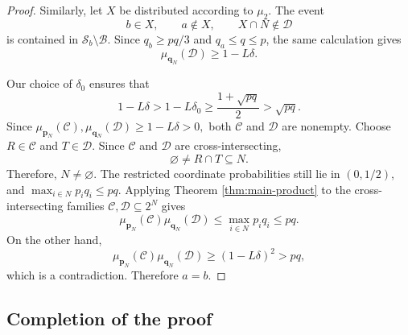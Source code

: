 \documentclass[11pt]{article}
\numberwithin{equation}{section}
\theoremstyle{definition}
\theoremstyle{remark}
\begin{document}
\begin{proof}
Similarly, let $X$ be distributed according to $\mu_2$. The event
$$
b\in X,
\qquad
a\notin X,
\qquad
X\cap N\notin\mathcal D
$$
is contained in $\mathcal S_b\setminus\mathcal B$. Since
$q_b\geq pq/3$ and $q_a\leq q\leq p$, the same calculation gives
$$
\mu_{\mathbf q_N}(\mathcal D)
\geq
1-L\delta.
$$

Our choice of $\delta_0$ ensures that
$$
1-L\delta
>
1-L\delta_0
\geq
\frac{1+\sqrt{pq}}{2}
>
\sqrt{pq}.
$$
Since
$
\mu_{\mathbf p_N}(\mathcal C),
\mu_{\mathbf q_N}(\mathcal D)
\geq
1-L\delta
>
0,
$
both $\mathcal C$ and $\mathcal D$ are nonempty. Choose
$R\in\mathcal C$ and $T\in\mathcal D$. Since $\mathcal C$ and
$\mathcal D$ are cross-intersecting,
$$
\varnothing\neq R\cap T\subseteq N.
$$
Therefore, $N\neq\varnothing$.
The restricted coordinate probabilities still lie in $(0,1/2)$,
and
$
\max_{i\in N}p_iq_i\leq pq.
$
Applying
Theorem \ref{thm:main-product}  to the cross-intersecting families
$\mathcal C,\mathcal D\subseteq2^N$ gives
$$
\mu_{\mathbf p_N}(\mathcal C)
\mu_{\mathbf q_N}(\mathcal D)
\leq
\max_{i\in N}p_iq_i
\leq
pq.
$$
On the other hand,
$$
\mu_{\mathbf p_N}(\mathcal C)
\mu_{\mathbf q_N}(\mathcal D)
\geq
(1-L\delta)^2
>
pq,
$$
which is a contradiction. Therefore $a=b$.
\end{proof}

\subsection{Completion of the proof}
\end{document}
